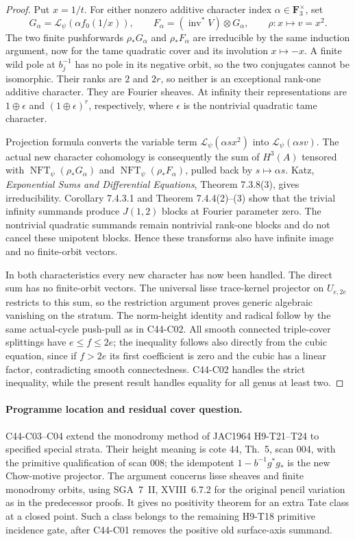 \documentclass[11pt]{article}
\theoremstyle{remark}\newtheorem{remark}[theorem]{Remark}
\begin{document}
\begin{proof}
Put $x=1/t$. For either nonzero additive character index
$\alpha\in\mathbf F_3^\times$, set
\[
 G_\alpha=\mathcal L_\psi(\alpha f_0(1/x)),\qquad
 F_\alpha=(\operatorname{inv}^*V)\otimes G_\alpha,
 \qquad \rho:x\longmapsto v=x^2.
\]
The two finite pushforwards $\rho_*G_\alpha$ and
$\rho_*F_\alpha$ are irreducible by the same induction argument,
now for the tame quadratic cover and its involution $x\mapsto-x$.
A finite wild pole at $b_j^{-1}$ has no pole in its negative orbit,
so the two conjugates cannot be isomorphic. Their ranks are $2$
and $2r$, so neither is an exceptional rank-one additive character.
They are Fourier sheaves. At infinity their representations are
$1\oplus\epsilon$ and $(1\oplus\epsilon)^r$, respectively,
where $\epsilon$ is the nontrivial quadratic tame character.

Projection formula converts the variable term
$\mathcal L_\psi(\alpha s x^2)$ into
$\mathcal L_\psi(\alpha s v)$. The actual new character
cohomology is consequently the sum of $H^3(A)$ tensored with
$\operatorname{NFT}_\psi(\rho_*G_\alpha)$ and
$\operatorname{NFT}_\psi(\rho_*F_\alpha)$, pulled back by
$s\mapsto\alpha s$. Katz, \emph{Exponential Sums and Differential
Equations}, Theorem 7.3.8(3), gives irreducibility. Corollary
7.4.3.1 and Theorem 7.4.4(2)--(3) show that the trivial infinity
summands produce $J(1,2)$ blocks at Fourier parameter zero.
The nontrivial quadratic summands remain nontrivial rank-one
blocks and do not cancel these unipotent blocks. Hence these
transforms also have infinite image and no finite-orbit vectors.

In both characteristics every new character has now been handled.
The direct sum has no finite-orbit vectors. The universal lisse
trace-kernel projector on $U_{e,2e}$ restricts to this sum, so
the restriction argument proves generic algebraic vanishing on
the stratum. The norm-height identity and radical follow by
the same actual-cycle push-pull as in C44-C02. All smooth connected
triple-cover splittings have $e\le f\le2e$; the inequality follows
also directly from the cubic equation, since if $f>2e$ its first
coefficient is zero and the cubic has a linear factor, contradicting
smooth connectedness. C44-C02 handles the strict inequality, while
the present result handles equality for all genus at least two.
\end{proof}

\paragraph{Programme location and residual cover question.}
C44-C03--C04 extend the monodromy method of JAC1964 H9-T21--T24 to
specified special strata. Their height meaning is cote 44, Th.~5,
scan 004, with the primitive qualification of scan 008; the
idempotent $1-b^{-1}g^*g_*$ is the new Chow-motive projector.
The argument concerns lisse sheaves and finite monodromy orbits,
using SGA~7~II, XVIII~6.7.2 for the original pencil variation as
in the predecessor proofs. It gives no positivity theorem for an
extra Tate class at a closed point. Such a class belongs to the
remaining H9-T18 primitive incidence gate, after C44-C01 removes
the positive old surface-axis summand.
\end{document}
